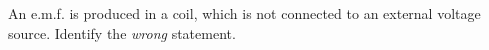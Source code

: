 An e.m.f. is produced in a coil, which is not connected to an external voltage source. 
Identify the  \emph{wrong} statement.